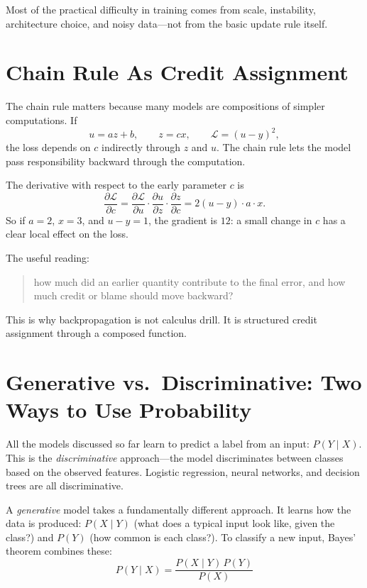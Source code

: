 Most of the practical difficulty in training comes from scale, instability, architecture choice, and noisy data---not from the basic update rule itself.

\section*{Chain Rule As Credit Assignment}

The chain rule matters because many models are compositions of simpler computations. If
\[
u = a z + b,
\qquad
z = c x,
\qquad
\mathcal{L} = (u-y)^2,
\]
the loss depends on \(c\) indirectly through \(z\) and \(u\). The chain rule lets the model pass responsibility backward through the computation.

The derivative with respect to the early parameter \(c\) is
\[
\frac{\partial \mathcal{L}}{\partial c}
=
\frac{\partial \mathcal{L}}{\partial u}
\cdot \frac{\partial u}{\partial z}
\cdot \frac{\partial z}{\partial c}
=
2(u-y)\cdot a \cdot x.
\]
So if \(a=2\), \(x=3\), and \(u-y=1\), the gradient is \(12\): a small change in \(c\) has a clear local effect on the loss.

The useful reading:

\begin{quote}
how much did an earlier quantity contribute to the final error, and how much credit or blame should move backward?
\end{quote}

This is why backpropagation is not calculus drill. It is structured credit assignment through a composed function.

\section*{Generative vs.\ Discriminative: Two Ways to Use Probability}

All the models discussed so far learn to predict a label from an input: $P(Y \mid X)$. This is the \emph{discriminative} approach---the model discriminates between classes based on the observed features. Logistic regression, neural networks, and decision trees are all discriminative.

A \emph{generative} model takes a fundamentally different approach. It learns how the data is produced: $P(X \mid Y)$ (what does a typical input look like, given the class?) and $P(Y)$ (how common is each class?). To classify a new input, Bayes' theorem combines these:
\[
P(Y \mid X) = \frac{P(X \mid Y) \, P(Y)}{P(X)}
\]

